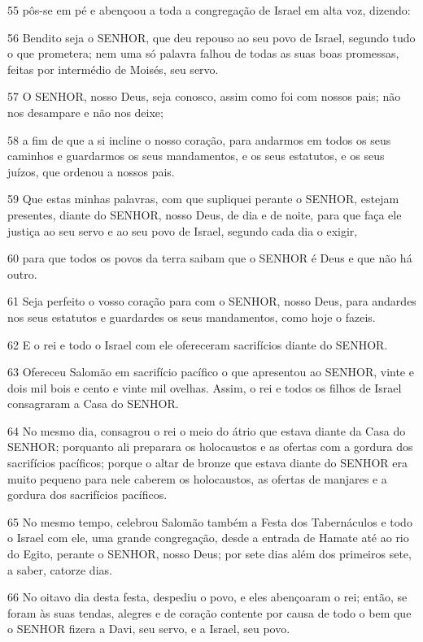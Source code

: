 \par 55 pôs-se em pé e abençoou a toda a congregação de Israel em alta voz, dizendo:
\par 56 Bendito seja o SENHOR, que deu repouso ao seu povo de Israel, segundo tudo o que prometera; nem uma só palavra falhou de todas as suas boas promessas, feitas por intermédio de Moisés, seu servo.
\par 57 O SENHOR, nosso Deus, seja conosco, assim como foi com nossos pais; não nos desampare e não nos deixe;
\par 58 a fim de que a si incline o nosso coração, para andarmos em todos os seus caminhos e guardarmos os seus mandamentos, e os seus estatutos, e os seus juízos, que ordenou a nossos pais.
\par 59 Que estas minhas palavras, com que supliquei perante o SENHOR, estejam presentes, diante do SENHOR, nosso Deus, de dia e de noite, para que faça ele justiça ao seu servo e ao seu povo de Israel, segundo cada dia o exigir,
\par 60 para que todos os povos da terra saibam que o SENHOR é Deus e que não há outro.
\par 61 Seja perfeito o vosso coração para com o SENHOR, nosso Deus, para andardes nos seus estatutos e guardardes os seus mandamentos, como hoje o fazeis.
\par 62 E o rei e todo o Israel com ele ofereceram sacrifícios diante do SENHOR.
\par 63 Ofereceu Salomão em sacrifício pacífico o que apresentou ao SENHOR, vinte e dois mil bois e cento e vinte mil ovelhas. Assim, o rei e todos os filhos de Israel consagraram a Casa do SENHOR.
\par 64 No mesmo dia, consagrou o rei o meio do átrio que estava diante da Casa do SENHOR; porquanto ali preparara os holocaustos e as ofertas com a gordura dos sacrifícios pacíficos; porque o altar de bronze que estava diante do SENHOR era muito pequeno para nele caberem os holocaustos, as ofertas de manjares e a gordura dos sacrifícios pacíficos.
\par 65 No mesmo tempo, celebrou Salomão também a Festa dos Tabernáculos e todo o Israel com ele, uma grande congregação, desde a entrada de Hamate até ao rio do Egito, perante o SENHOR, nosso Deus; por sete dias além dos primeiros sete, a saber, catorze dias.
\par 66 No oitavo dia desta festa, despediu o povo, e eles abençoaram o rei; então, se foram às suas tendas, alegres e de coração contente por causa de todo o bem que o SENHOR fizera a Davi, seu servo, e a Israel, seu povo.

